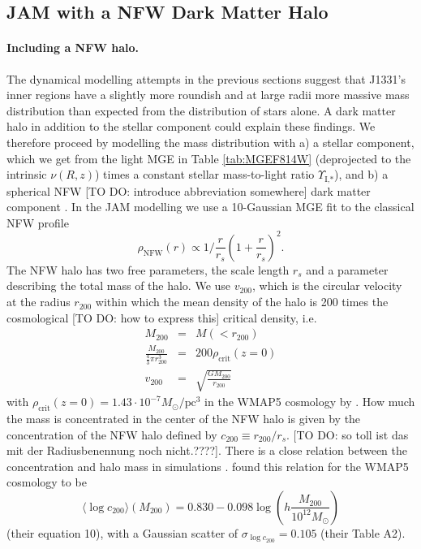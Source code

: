 \subsection{JAM with a NFW Dark Matter Halo} \label{sec:results_JAM_NFW}

\paragraph{Including a NFW halo.} The dynamical modelling attempts in the previous sections suggest that J1331's inner regions have a slightly more roundish and at large radii more massive mass distribution than expected from the distribution of stars alone. A dark matter halo in addition to the stellar component could explain these findings. We therefore proceed by modelling the mass distribution with a) a stellar component, which we get from the light MGE in Table \ref{tab:MGEF814W} (deprojected to the intrinsic $\nu(R,z)$) times a constant stellar mass-to-light ratio $\Upsilon_\text{I,*}$), and b) a spherical NFW [TO DO: introduce abbreviation somewhere] dark matter component \citep{Navarro+1995c,NFW96}. In the JAM modelling we use a 10-Gaussian MGE fit to the classical NFW profile
\begin{equation*}
\rho_\text{NFW}(r) \propto 1 / \frac{r}{r_s} \left( 1 + \frac{r}{r_s} \right)^2.
\end{equation*}
The NFW halo has two free parameters, the scale length $r_s$ and a parameter describing the total mass of the halo. We use $v_\text{200}$, which is the circular velocity at the radius $r_\text{200}$ within which the mean density of the halo is 200 times the cosmological [TO DO: how to express this] critical density, i.e.
\begin{eqnarray*}
M_\text{200} &=& M(<r_{200})\\
\frac{M_{200}}{ \frac 43 \pi r_{200}^3} &=& 200 \rho_\text{crit}(z=0) \\
v_\text{200} &=& \sqrt{\frac{GM_{200}}{r_\text{200}}}
\end{eqnarray*}
with $\rho_\text{crit}(z=0)=1.43 \cdot 10^{-7} M_\odot / \text{pc}^3$ in the WMAP5 cosmology by \citet{WMAP5cosm}. How much the mass is concentrated in the center of the NFW halo is given by the concentration of the NFW halo defined by $c_{200}\equiv r_{200} / r_s$. [TO DO: so toll ist das mit der Radiusbenennung noch nicht.????]. There is a close relation between the concentration and halo mass in simulations \citep{NFW96}. \citet{Maccio08} found this relation for the WMAP5 cosmology \citep{WMAP5cosm} to be
\begin{equation}
\langle \log c_{200} \rangle (M_{200}) = 0.830 - 0.098 \log \left(h \frac{M_{200}}{10^{12} M_\odot} \right) \label{eq:Maccio08}
\end{equation}
(their equation 10), with a Gaussian scatter of $\sigma_{\log c_{200}} = 0.105$ (their Table A2).


